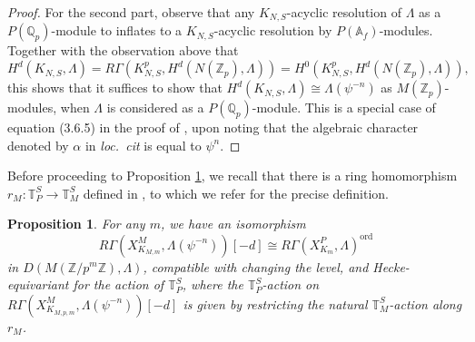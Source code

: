 \documentclass{amsart}
\newtheorem{prop}[subsubsection]{Proposition}
\theoremstyle{remark}
\numberwithin{equation}{subsection}
\newcommand{\A}{\AA}
\newcommand{\Q}{\QQ}
\newcommand{\Z}{\ZZ}
\renewcommand{\AA}{{\mathbb A}}
\newcommand{\QQ}{{\mathbb Q}}
\newcommand{\ZZ}{{\mathbb Z}}
\newcommand{\Zp}{\Z_p}
\newcommand{\Qp}{\Q_p}
\newcommand{\XP}[1][m]{X^{P}_{K_{#1}}}
\DeclareMathOperator{\ord}{ord}
\renewcommand{\(}{\left(}
\renewcommand{\)}{\right)}
\begin{document}
\begin{proof}
\medskip
For the second part, observe that any $K_{N,S}$-acyclic resolution of $\Lambda$ as a $P(\Qp)$-module to inflates to a $K_{N,S}$-acyclic resolution by $P(\A_f)$-modules. Together with the observation above that 
\[
H^d(K_{N,S},\Lambda) = R\Gamma(K_{N,S}^p, H^d(N(\Zp),\Lambda)) = H^0(K_{N,S}^p,H^d(N(\Zp),\Lambda)),
\] 
this shows that it suffices to show that $H^d(K_{N,S}, \Lambda)\cong \Lambda(\psi^{-n})$ as $M(\Zp)$-modules, when $\Lambda$ is considered as a $P(\Qp)$-module. This is a special case of equation (3.6.5) in the proof of \cite[Proposition 3.6.2]{emerton-ord}, upon noting that the algebraic character denoted by $\alpha$ in \emph{loc.\ cit} is equal to $\psi^{n}$.
\end{proof}

Before proceeding to Proposition \ref{XM to XP}, we recall that there is a ring homomorphism $r_M \colon \mathbb{T}^S_P\to \mathbb{T}^S_M$ defined in \cite[\S 2.2.4, 2.2.5]{newton-thorne}, to which we refer for the precise definition.

\begin{prop} \label{XM to XP} For any $m$, we have an isomorphism
\[
R\Gamma(X_{K_{M,m}}^M,\Lambda(\psi^{-n}))[-d] \cong R\Gamma(\XP,\Lambda)^{\ord}
\]
in $D(M(\Z/p^{m}\Z), \Lambda)$, compatible with changing the level, and Hecke-equivariant for the action of $\mathbb{T}_P^S$, where the $\mathbb{T}_P^S$-action on $R\Gamma(X_{K_{M,p,m}}^M,\Lambda(\psi^{-n}))[-d]$ is given by restricting the natural $\mathbb{T}_M^S$-action along $r_M$. 
\end{prop}
\end{document}
